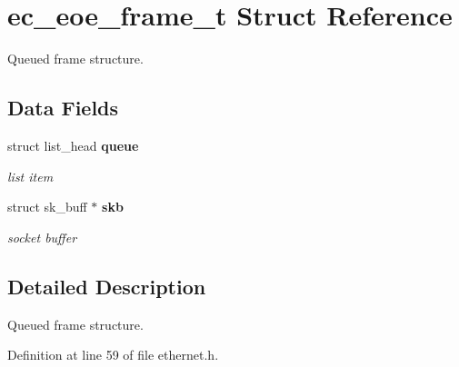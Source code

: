 \section{ec\-\_\-eoe\-\_\-frame\-\_\-t Struct Reference}
\label{structec__eoe__frame__t}


Queued frame structure.  


\subsection*{Data Fields}
\begin{DoxyCompactItemize}
\item 
struct list\-\_\-head {\bf queue}\label{structec__eoe__frame__t_a1c6d064788e29158bd03601b481bcfa5}

\begin{DoxyCompactList}\small\item\em list item \end{DoxyCompactList}\item 
struct sk\-\_\-buff $\ast$ {\bf skb}\label{structec__eoe__frame__t_a373ee9510d98da5da3077944d5d074cb}

\begin{DoxyCompactList}\small\item\em socket buffer \end{DoxyCompactList}\end{DoxyCompactItemize}


\subsection{Detailed Description}
Queued frame structure. 

Definition at line 59 of file ethernet.\-h.

